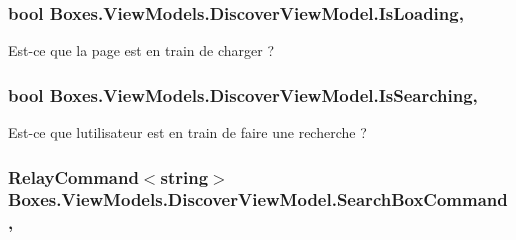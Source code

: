 \subsubsection[{\texorpdfstring{Is\+Loading}{IsLoading}}]{\setlength{\rightskip}{0pt plus 5cm}bool Boxes.\+View\+Models.\+Discover\+View\+Model.\+Is\+Loading\hspace{0.3cm}{\ttfamily [get]}, {\ttfamily [set]}}\hypertarget{class_boxes_1_1_view_models_1_1_discover_view_model_a8979aad196a45eb8c7de27c8d9650dfa}{}\label{class_boxes_1_1_view_models_1_1_discover_view_model_a8979aad196a45eb8c7de27c8d9650dfa}


Est-\/ce que la page est en train de charger ? 

\subsubsection[{\texorpdfstring{Is\+Searching}{IsSearching}}]{\setlength{\rightskip}{0pt plus 5cm}bool Boxes.\+View\+Models.\+Discover\+View\+Model.\+Is\+Searching\hspace{0.3cm}{\ttfamily [get]}, {\ttfamily [set]}}\hypertarget{class_boxes_1_1_view_models_1_1_discover_view_model_aedda1c3e0c8e0d0269aad154ce7132f2}{}\label{class_boxes_1_1_view_models_1_1_discover_view_model_aedda1c3e0c8e0d0269aad154ce7132f2}


Est-\/ce que l\textquotesingle{}utilisateur est en train de faire une recherche ? 

\subsubsection[{\texorpdfstring{Search\+Box\+Command}{SearchBoxCommand}}]{\setlength{\rightskip}{0pt plus 5cm}Relay\+Command$<$string$>$ Boxes.\+View\+Models.\+Discover\+View\+Model.\+Search\+Box\+Command\hspace{0.3cm}{\ttfamily [get]}, {}}\hypertarget{class_boxes_1_1_view_models_1_1_discover_view_model_ad7bc4f429321d175c2de48df673e2a8e}{}\label{class_boxes_1_1_view_models_1_1_discover_view_model_ad7bc4f429321d175c2de48df673e2a8e}


